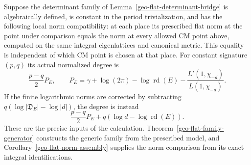 \begin{proposition}\label{geo-cm-flat-degree}
Suppose the determinant family of
Lemma~\ref{geo-flat-determinant-bridge} is algebraically defined,
is constant in the period trivialization, and has the following
local norm compatibility: at each place its prescribed flat norm
at the point under comparison equals the norm at every allowed
CM point above, computed on the same integral eigenlattices and
canonical metric. This equality is independent of which CM
point is chosen at that place.
For constant signature $(p,q)$ its actual normalized degree is
\[
 \frac{p-q}{2}P_E,\qquad
 P_E=\gamma+\log(2\pi)-\log\operatorname{rd}(E)
                     -\frac{L'(1,\chi_{-d})}{L(1,\chi_{-d})}.
\]
If the finite logarithmic norms are corrected by subtracting
$q(\log|\mathfrak D_E|-\log|d|)$, the degree is instead
\[
             \frac{p-q}{2}P_E
                      +q(\log d-\log\operatorname{rd}(E)).
\]
These are the precise inputs of the calculation.
Theorem~\ref{geo-flat-family-generator} constructs the generic family
from the prescribed model, and Corollary~\ref{geo-flat-norm-assembly}
supplies the norm comparison from its exact integral identifications.
\end{proposition}
